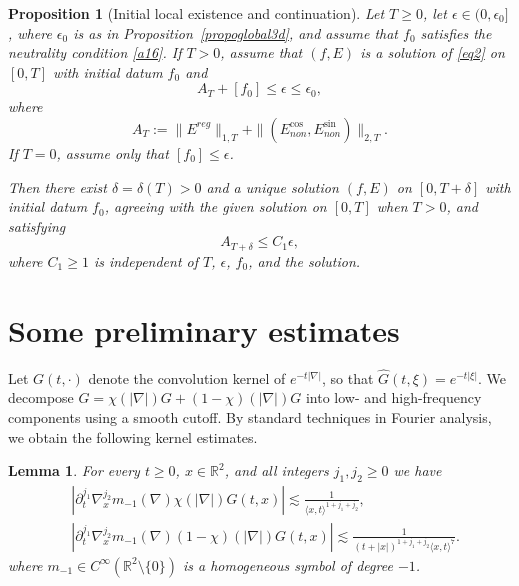 \documentclass[reqno,11pt]{amsart}
\numberwithin{equation}{section}
\def\R{{\mathbb R}}
\def\R{{\bf R}}
\def\R{\mathbb{R}}
\newtheorem{lemma}[theorem]{Lemma}
\newtheorem{proposition}[theorem]{Proposition}
\begin{document}
	\begin{proposition}[Initial local existence and continuation]\label{Localwell}
		Let $T\geq0$, let $\epsilon\in(0,\epsilon_0]$, where $\epsilon_0$
		is as in Proposition~\ref{propoglobal3d}, and assume that $f_0$
		satisfies the neutrality condition \eqref{a16}.
		If $T>0$, assume that $(f,E)$ is a solution of \eqref{eq2}
		on $[0,T]$ with initial datum $f_0$ and
		\begin{equation}\label{bo1'}
		A_T+[f_0]\leq\epsilon\leq\epsilon_0,
		\end{equation}
		where
		\begin{equation}\label{local-AT}
			A_T:=\|E^{reg}\|_{1,T}+\|(E^{\cos}_{non},E^{\sin}_{non})\|_{2,T}.
		\end{equation}
		If $T=0$, assume only that $[f_0]\leq\epsilon$.
		
		Then there exist $\delta=\delta(T)>0$ and a unique solution
		$(f,E)$ on $[0,T+\delta]$ with initial datum $f_0$,
		agreeing with the given solution on $[0,T]$ when $T>0$, and satisfying
		\begin{equation}\label{bo2}
			A_{T+\delta}\leq C_1\epsilon,
		\end{equation}
		where $C_1\geq1$ is independent of $T$, $\epsilon$, $f_0$,
		and the solution.
	\end{proposition}
	
	
	
	
	
	\section{Some preliminary estimates}
	
	Let $G(t,\cdot)$ denote the convolution kernel of
	$e^{-t|\nabla|}$, so that $\widehat G(t,\xi)=e^{-t|\xi|}$. 
	We decompose $G=\chi(|\nabla|)G+(1-\chi)(|\nabla|)G$ into low- and high-frequency components using a smooth cutoff.
	By standard techniques in Fourier analysis, we obtain the following kernel estimates.
	
	\begin{lemma}\label{keres}
		For every $t\geq 0$, $x\in\mathbb R^2$, and all integers $j_1,j_2\ge0$ we have
		\begin{align}\label{esG1}
			&	|\partial_{t}^{j_1}\nabla_x^{j_2}m_{-1}(\nabla)\chi(|\nabla|)G(t,x)|\lesssim \frac{1}{\langle x,t\rangle^{1+j_1+j_2}},\\
			&|\partial_{t}^{j_1}\nabla_x^{j_2}m_{-1}(\nabla)(1-\chi)(|\nabla|)G(t,x)|\lesssim \frac{1}{(t+|x|)^{1+j_1+j_2}\langle x,t\rangle^{7}}.\label{esG2}
		\end{align}
	where $m_{-1}\in C^\infty(\R^2\setminus\{0\})$ is a homogeneous symbol of degree $-1$.
	\end{lemma}
	
\end{document}

